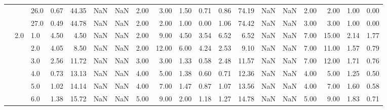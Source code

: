\begin{tabular}{lllrrrrrrrrrrrrrrrr}
          &     & 26.0 &      0.67 &      44.35 &               NaN &                NaN &  2.00 &   3.00 &             1.50 &                         0.71 &      0.86 &      74.19 &               NaN &                NaN &  2.00 &   2.00 &             1.00 &                         0.00 \\
          &     & 27.0 &      0.49 &      44.78 &               NaN &                NaN &  2.00 &   2.00 &             1.00 &                         0.00 &      1.06 &      74.42 &               NaN &                NaN &  3.00 &   3.00 &             1.00 &                         0.00 \\
          & 2.0 & 1.0  &      4.50 &       4.50 &               NaN &                NaN &  2.00 &   9.00 &             4.50 &                         3.54 &      6.52 &       6.52 &               NaN &                NaN &  7.00 &  15.00 &             2.14 &                         1.77 \\
          &     & 2.0  &      4.05 &       8.50 &               NaN &                NaN &  2.00 &  12.00 &             6.00 &                         4.24 &      2.53 &       9.10 &               NaN &                NaN &  7.00 &  11.00 &             1.57 &                         0.79 \\
          &     & 3.0  &      2.56 &      11.72 &               NaN &                NaN &  3.00 &   3.00 &             1.33 &                         0.58 &      2.48 &      11.57 &               NaN &                NaN &  7.00 &  12.00 &             1.71 &                         0.76 \\
          &     & 4.0  &      0.73 &      13.13 &               NaN &                NaN &  4.00 &   5.00 &             1.38 &                         0.60 &      0.71 &      12.36 &               NaN &                NaN &  4.00 &   5.00 &             1.25 &                         0.50 \\
          &     & 5.0  &      1.02 &      14.14 &               NaN &                NaN &  4.00 &   7.00 &             1.47 &                         0.87 &      1.07 &      13.56 &               NaN &                NaN &  4.00 &   7.00 &             1.60 &                         0.58 \\
          &     & 6.0  &      1.38 &      15.72 &               NaN &                NaN &  5.00 &   9.00 &             2.00 &                         1.18 &      1.27 &      14.78 &               NaN &                NaN &  5.00 &   9.00 &             1.83 &                         0.71 \\

\end{tabular}
